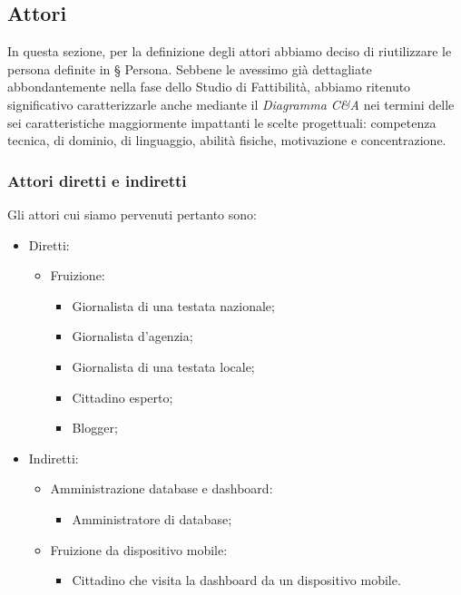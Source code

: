 \subsection{Attori}
\label{ss:attori}
In questa sezione, per la definizione degli attori abbiamo deciso di riutilizzare le persona definite in § Persona.
Sebbene le avessimo già dettagliate abbondantemente nella fase dello Studio di Fattibilità, abbiamo ritenuto significativo caratterizzarle anche mediante il \textit{Diagramma C\&A} nei termini delle sei caratteristiche maggiormente impattanti le scelte progettuali: competenza tecnica, di dominio, di linguaggio, abilità fisiche, motivazione e concentrazione.

\noindent
\subsubsection{Attori diretti e indiretti}
\label{sss:attori-diretti-indiretti}
Gli attori cui siamo pervenuti pertanto sono:
\begin{itemize}
    \item Diretti:
    \begin{itemize}
        \item Fruizione:
        \begin{itemize}
            \item Giornalista di una testata nazionale;
            \item Giornalista d'agenzia;
            \item Giornalista di una testata locale;
            \item Cittadino esperto;
            \item Blogger;
        \end{itemize}
    \end{itemize}
    \item Indiretti:
    \begin{itemize}
        \item Amministrazione database e dashboard:
        \begin{itemize}
            \item Amministratore di database;
        \end{itemize}
        \item Fruizione da dispositivo mobile:
        \begin{itemize}
            \item Cittadino che visita la dashboard da un dispositivo mobile.
        \end{itemize}
    \end{itemize}
\end{itemize}

